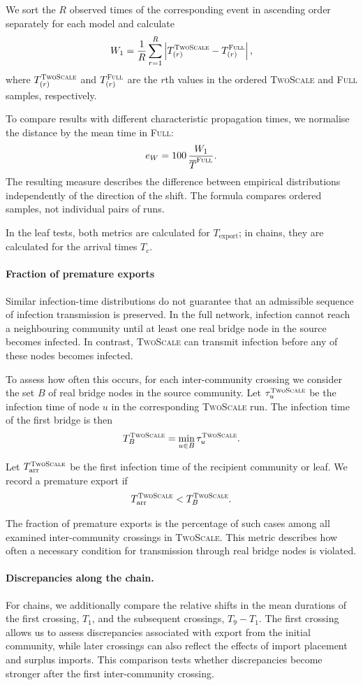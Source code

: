 \documentclass[a4paper,fleqn]{cas-sc}
\newcommand{\Full}{\textup{\textsc{Full}}}
\newcommand{\TS}{\textup{\textsc{TwoScale}}}
\newcommand{\eW}{e_{W}}
\begin{document}
We sort the $R$ observed times of the corresponding event in ascending order separately for each model and calculate
\[
W_1 =
\frac{1}{R}
\sum_{r=1}^{R}
\left|
T_{(r)}^{\TS}-T_{(r)}^{\Full}
\right|,
\]
where $T_{(r)}^{\TS}$ and $T_{(r)}^{\Full}$ are the $r$th values in the ordered \TS{} and \Full{} samples, respectively.

To compare results with different characteristic propagation times, we normalise the distance by the mean time in \Full{}:
\[
\eW =
100\,\frac{W_1}{\overline{T}^{\Full}}.
\]
The resulting measure describes the difference between empirical distributions independently of the direction of the shift. The formula compares ordered samples, not individual pairs of runs.

In the leaf tests, both metrics are calculated for $T_{\mathrm{export}}$; in chains, they are calculated for the arrival times $T_c$.

\paragraph{Fraction of premature exports}
Similar infection-time distributions do not guarantee that an admissible sequence of infection transmission is preserved. In the full network, infection cannot reach a neighbouring community until at least one real bridge node in the source becomes infected. In contrast, \TS{} can transmit infection before any of these nodes becomes infected.

To assess how often this occurs, for each inter-community crossing we consider the set $B$ of real bridge nodes in the source community. Let $\tau_u^{\TS}$ be the infection time of node $u$ in the corresponding \TS{} run. The infection time of the first bridge is then
\[
T_B^{\TS}=\min_{u\in B}\tau_u^{\TS}.
\]

Let $T_{\mathrm{arr}}^{\TS}$ be the first infection time of the recipient community or leaf. We record a premature export if
\[
T_{\mathrm{arr}}^{\TS}<T_B^{\TS}.
\]

The fraction of premature exports is the percentage of such cases among all examined inter-community crossings in \TS{}. This metric describes how often a necessary condition for transmission through real bridge nodes is violated.

\paragraph{Discrepancies along the chain.}
For chains, we additionally compare the relative shifts in the mean durations of the first crossing, $T_1$, and the subsequent crossings, $T_9-T_1$. The first crossing allows us to assess discrepancies associated with export from the initial community, while later crossings can also reflect the effects of import placement and surplus imports. This comparison tests whether discrepancies become stronger after the first inter-community crossing.
\end{document}
